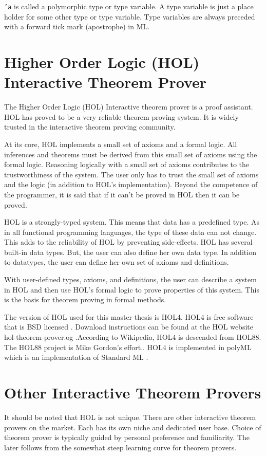 \documentclass[../../main/main.tex]{subfiles}
\begin{document}
\texttt{'a} is called a polymorphic type or type variable.  A type variable is just a place holder for some other type or type variable.  Type variables are always preceded with a forward tick mark (apostrophe) in ML.


\section{Higher Order Logic (HOL) Interactive Theorem Prover}
The Higher Order Logic (HOL) Interactive theorem prover is a proof assistant.  HOL has proved to be a very reliable theorem proving system.  It is widely trusted in the interactive theorem proving community.

At its core, HOL implements a small set of axioms and a formal logic.  All inferences and theorems must be derived from this small set of axioms using the formal logic.  Reasoning logically with a small set of axioms contributes to the trustworthiness of the system.  The user only has to trust the small set of axioms and the logic (in addition to HOL's implementation).  Beyond the competence of the programmer, it is said that if it can't be proved in HOL then it can be proved.  

HOL is a strongly-typed system.  This means that data has a predefined type.  As in all functional programming languages, the type of these data can not change.  This adds to the reliability of HOL by preventing side-effects. HOL has several built-in data types.  But, the user can also define her own data type.   In addition to datatypes, the user can define her own set of axioms and definitions.  

With user-defined types, axioms, and definitions, the user can describe a system in HOL and then use HOL's formal logic to prove properties of this system.  This is the basis for theorem proving in formal methods.

The version of HOL used for this master thesis is HOL4.  HOL4 is free software that is BSD licensed \cite{BSDlicenses}.  Download instructions can be found at the HOL website hol-theorem-prover.og \cite{HOL}.According to Wikipedia, HOL4 is descended from HOL88.  The HOL88 project is Mike Gordon's effort..  HOL4 is implemented in polyML which is an implementation of Standard ML \cite{HOLwiki}.

\section{Other Interactive Theorem Provers}
It should be noted that HOL is not unique. There are other interactive theorem provers on the market. Each has its own niche and dedicated user base.  Choice of theorem prover is typically guided by personal preference and familiarity. The later follows from the somewhat steep learning curve for theorem provers. 
\end{document}
